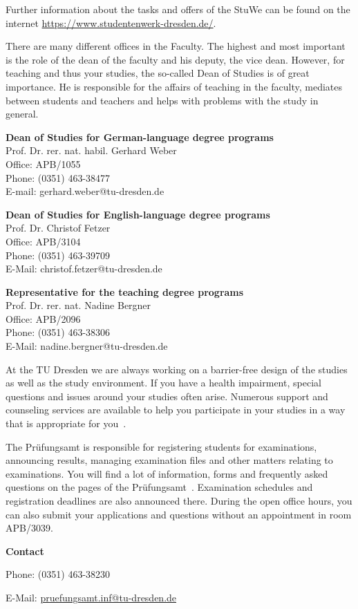 Further information about the tasks and offers of the StuWe can be found on the internet 
\url{https://www.studentenwerk-dresden.de/}.


There are many different offices in the Faculty. The highest and most important is the role of the dean of the faculty and his deputy, the vice dean. However, for teaching and thus your studies, the so-called Dean of Studies is of great importance. He is responsible for the affairs of teaching in the faculty, mediates between students and teachers and helps with problems with the study in general.

\pagebreak
\textbf{Dean of Studies for German-language degree programs}\\
Prof. Dr. rer. nat. habil. Gerhard Weber \\
Office: APB/1055 \\
Phone: (0351) 463-38477 \\
E-mail: gerhard.weber@tu-dresden.de

\textbf{Dean of Studies for English-language degree programs}\\
Prof. Dr. Christof Fetzer \\
Office: APB/3104 \\
Phone: (0351) 463-39709 \\
E-Mail: christof.fetzer@tu-dresden.de

\textbf{Representative for the teaching degree programs}\\
Prof. Dr. rer. nat. Nadine Bergner \\
Office: APB/2096 \\
Phone: (0351) 463-38306 \\
E-Mail: nadine.bergner@tu-dresden.de


At the TU Dresden we are always working on a barrier-free design of the studies as well as the study environment. If you have a health impairment, special questions and issues around your studies often arise. Numerous support and counseling services are available to help you participate in your studies in a way that is appropriate for you~.


\label{sec:pruefungsamt}
The Prüfungsamt is responsible for registering students for examinations, announcing results, managing examination files and other matters relating to examinations. You will find a lot of information, forms and frequently asked questions on the pages of the Prüfungsamt~. Examination schedules and registration deadlines are also announced there. During the open office hours, you can also submit your applications and questions without an appointment in room APB/3039.

\textbf{Contact}

Phone: (0351) 463-38230

E-Mail: \href{mailto:pruefungsamt.inf@tu-dresden.de}{pruefungsamt.inf@tu-dresden.de}

